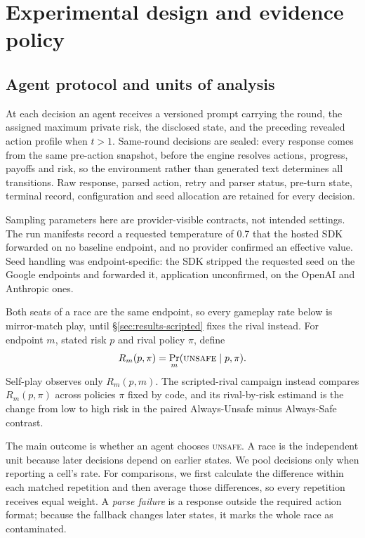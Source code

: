 \documentclass[sigconf,anonymous]{aamas}
\newcommand{\Unsafe}{\textsc{unsafe}}
\begin{document}
\section{Experimental design and evidence policy}
\label{sec:design}
\subsection{Agent protocol and units of analysis}

At each decision an agent receives a versioned prompt carrying the round, the assigned maximum private risk, the disclosed state, and the preceding revealed action profile when $t>1$. Same-round decisions are sealed: every response comes from the same pre-action snapshot, before the engine resolves actions, progress, payoffs and risk, so the environment rather than generated text determines all transitions. Raw response, parsed action, retry and parser status, pre-turn state, terminal record, configuration and seed allocation are retained for every decision.

Sampling parameters here are provider-visible contracts, not intended
settings. The run manifests record a requested temperature of 0.7 that the
hosted SDK forwarded on no baseline endpoint, and no provider confirmed an
effective value. Seed handling was endpoint-specific: the SDK stripped the
requested seed on the Google endpoints and forwarded it, application
unconfirmed, on the OpenAI and Anthropic ones.

Both seats of a race are the same endpoint, so every gameplay rate below is
mirror-match play, until \S\ref{sec:results-scripted} fixes the rival instead.
For endpoint $m$, stated risk $p$ and rival policy $\pi$, define
\begin{equation}
    R_m(p,\pi)=\Pr_m(\Unsafe{}\mid p,\pi).
    \label{eq:opponent-conditioned-risk}
\end{equation}
Self-play observes only $R_m(p,m)$. The scripted-rival campaign instead compares
$R_m(p,\pi)$ across policies $\pi$ fixed by code, and its rival-by-risk estimand
is the change from low to high risk in the paired Always-Unsafe minus Always-Safe
contrast.

The main outcome is whether an agent chooses \Unsafe{}. A race is the independent
unit because later decisions depend on earlier states. We pool decisions only
when reporting a cell's rate. For comparisons, we first calculate the difference
within each matched repetition and then average those differences, so every
repetition receives equal weight. A \emph{parse failure} is a response outside
the required action format; because the fallback changes later states, it marks
the whole race as contaminated.
\end{document}
